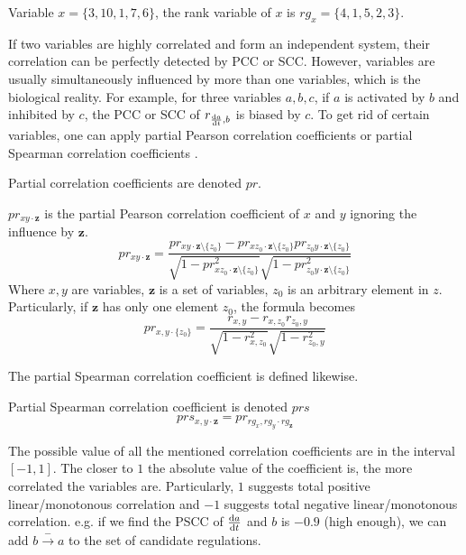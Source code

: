 \begin{example}
Variable $x=\{3,10,1,7,6\}$, the rank variable of $x$ is $rg_x=\{4,1,5,2,3\}$.
\end{example}


If two variables are highly correlated and form an independent system, their correlation can be perfectly detected by PCC or SCC.
However, variables are usually simultaneously influenced by more than one variables, which is the biological reality.
For example, for three variables $a,b,c$, if $a$ is activated by $b$ and inhibited by $c$, the PCC or SCC of $r_{\frac{{\rm d}a}{{\rm d}t},b}$ is biased by $c$. 
To get rid of certain variables, one can apply partial Pearson correlation coefficients \cite{baba2004partial} or partial Spearman correlation coefficients \cite{borror2001practical}.

Partial correlation coefficients are denoted $pr$.

\begin{definition}\label{def:PPCC}
    $pr_{xy\cdot \mathbf {z}}$ is the partial Pearson correlation coefficient of $x$ and $y$ ignoring the influence by $\mathbf {z}$.
    $$pr _{xy\cdot \mathbf {z} }={\frac {pr _{xy\cdot \mathbf {z} \setminus \{z_{0}\}}-pr _{xz_{0}\cdot \mathbf {z} \setminus \{z_{0}\}}pr _{z_{0}y\cdot \mathbf {z} \setminus \{z_{0}\}}}{{\sqrt {1-pr _{xz_{0}\cdot \mathbf {z} \setminus \{z_{0}\}}^{2}}}{\sqrt {1-pr _{z_{0}y\cdot \mathbf {z} \setminus \{z_{0}\}}^{2}}}}}$$
    Where $x,y$ are variables, $\mathbf {z}$ is a set of variables, $z_0$ is an arbitrary element in $z$. 
    Particularly, if $\mathbf {z}$ has only one element $z_0$, the formula becomes
    $$pr_{x,y\cdot \{z_0\}}={\frac {r _{x,y}-r _{x,z_0}r _{z_0,y}}{{\sqrt {1-r _{x,z_0}^{2}}}{\sqrt {1-r _{z_0,y}^{2}}}}}$$

\end{definition}

The partial Spearman correlation coefficient is defined likewise.
\begin{definition}\label{def:PSCC}
Partial Spearman correlation coefficient is denoted $prs$
    $$prs_{x,y\cdot \mathbf {z}}=pr_{rg_x,rg_y\cdot rg_\mathbf {z}}$$%
\end{definition}

The possible value of all the mentioned correlation coefficients are in the interval $[-1,1]$.
The closer to $1$ the absolute value of the coefficient is, the more correlated the variables are.
Particularly, $1$ suggests total positive linear/monotonous correlation and $-1$ suggests total negative linear/monotonous correlation. 
e.g. if we find the PSCC of $\frac{{\rm d}a}{{\rm d}t}$ and $b$ is $-0.9$ (high enough), we can add $b\xrightarrow{-}a$ to the set of candidate regulations.

